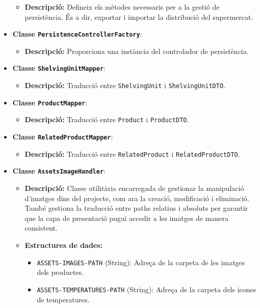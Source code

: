 \documentclass[a4paper,12pt]{report}
\begin{document}
\begin{itemize}
\begin{itemize}
		      \item \textbf{Descripció:} Defineix els mètodes necessaris per a la gestió de persistència. És a dir, exportar i importar la distribució del supermercat.
	      \end{itemize}
	\item \textbf{Classe \texttt{PersistenceControllerFactory}}:
	      \begin{itemize}
		      \item \textbf{Descripció:} Proporciona una instància del controlador de persistència.
	      \end{itemize}
	\item \textbf{Classe \texttt{ShelvingUnitMapper}}:
	      \begin{itemize}
		      \item \textbf{Descripció:} Traducció entre \texttt{ShelvingUnit} i \texttt{ShelvingUnitDTO}.
			\end{itemize}
	\item \textbf{Classe \texttt{ProductMapper}}:
	      \begin{itemize}
		      \item \textbf{Descripció:} Traducció entre \texttt{Product} i \texttt{ProductDTO}.
	      \end{itemize}
	\item \textbf{Classe \texttt{RelatedProductMapper}}:
	      \begin{itemize}
		      \item \textbf{Descripció:} Traducció entre \texttt{RelatedProduct} i \texttt{RelatedProductDTO}.
	      \end{itemize}
	\item \textbf{Classe \texttt{AssetsImageHandler}}:
	      \begin{itemize}
		      \item \textbf{Descripció:} Classe utilitària encarregada de gestionar la manipulació d'imatges dins del projecte, com ara la creació, modificació i eliminació. També gestiona la traducció entre paths relatius i absoluts per garantir que la capa de presentació pugui accedir a les imatges de manera consistent.
			  \item \textbf{Estructures de dades:}
			  \begin{itemize}
				\item \texttt{ASSETS-IMAGES-PATH} (String): Adreça de la carpeta de les imatges dels productes.
				\item \texttt{ASSETS-TEMPERATURES-PATH} (String): Adreça de la carpeta dels icones de temperatures.

\end{itemize}
\end{itemize}
\end{itemize}
\end{document}
